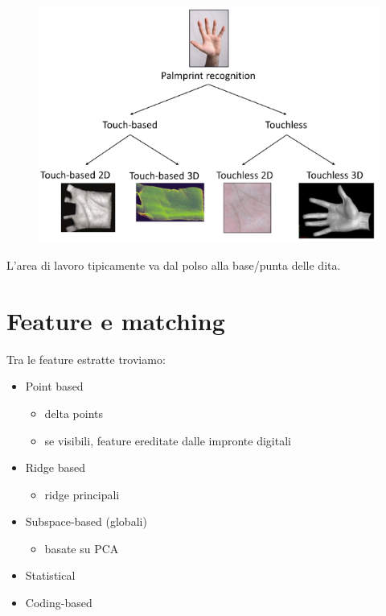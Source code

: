 \documentclass{report}
\begin{document}
\begin{figure}[ht]
    \centering
    \includegraphics[width=1\linewidth]{images/palmo.png}
\end{figure}

\noindent L'area di lavoro tipicamente va dal polso 
alla base/punta delle dita.

\newpage
\section{Feature e matching}

Tra le feature estratte troviamo:
\begin{itemize}
    \item Point based
    \begin{itemize}
        \item delta points 
        \item se visibili, feature ereditate dalle impronte digitali 
    \end{itemize}
    \item Ridge based
    \begin{itemize}
        \item ridge principali 
    \end{itemize}
    \item Subspace-based (globali)
    \begin{itemize}
        \item basate su PCA 
    \end{itemize}
    \item Statistical 
    \item Coding-based
\end{itemize}
\end{document}
